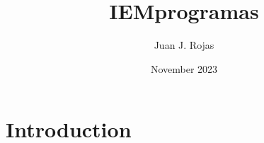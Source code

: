 \documentclass{article}
\title{IEMprogramas}
\author{Juan J. Rojas}
\date{November 2023}
\begin{document}
\maketitle

\section{Introduction}
\end{document}
